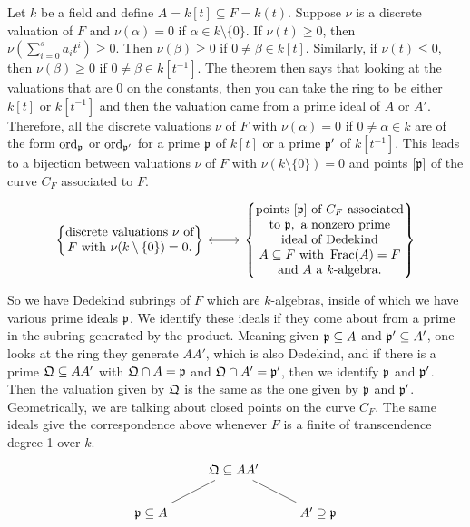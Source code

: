 \begin{ex}
Let $k$ be a field and define $A=k[t] \subseteq F=k(t)$. Suppose $\nu$ is a discrete valuation of $F$ and $\nu(\alpha)=0$ if $\alpha \in k \setminus \{0\}$. If $\nu(t) \geq 0$, then $\nu(\sum_{i=0}^s a_it^i) \geq 0$. Then $\nu(\beta) \geq 0$ if $0 \neq \beta \in k[t]$. Similarly, if $\nu(t) \leq 0$, then $\nu(\beta) \geq 0$ if $0 \neq \beta \in k[t^{-1}]$. The theorem then says that looking at the valuations that are 0 on the constants, then you can take the ring to be either $k[t]$ or $k[t^{-1}]$ and then the valuation came from a prime ideal of $A$ or $A'$. Therefore, all the discrete valuations $\nu$ of $F$ with $\nu(\alpha)=0$ if $0 \neq \alpha \in k$ are of the form $\operatorname{ord}_{\mathfrak{p}}$ or $\operatorname{ord}_{\mathfrak{p}'}$ for a prime $\mathfrak{p}$ of $k[t]$ or a prime $\mathfrak{p}'$ of $k[t^{-1}]$. This leads to a bijection between valuations $\nu$ of $F$ with $\nu(k \setminus \{0\})=0$ and points $[\mathfrak{p}]$ of the curve $C_F$ associated to $F$.
	\[
	\begin{tikzcd}
	\left\{ \begin{array}{@{}c@{}} \text{discrete valuations }\nu \text{ of} \\ F \text{ with } \nu(k\setminus\{0\})=0.\end{array} \right\} \arrow[leftrightarrow]{r} &  \left\{ \begin{array}{@{}c@{}} \text{points }[\p] \text{ of }C_F \text{ associated}\\ \text{to }\p, \text{ a nonzero prime} \\ \text{ideal of Dedekind} \\ A \subseteq F \text{ with } \Frac(A)=F \\ \text{and }A \text{ a }k\text{-algebra}.\end{array} \right\}
	\end{tikzcd}
	\]
So we have Dedekind subrings of $F$ which are $k$-algebras, inside of which we have various prime ideals $\mathfrak{p}$. We identify these ideals if they come about from a prime in the subring generated by the product. Meaning given $\mathfrak{p} \subseteq A$ and $\mathfrak{p}' \subseteq A'$, one looks at the ring they generate $AA'$, which is also Dedekind, and if there is a prime $\mathfrak{Q} \subseteq AA'$ with $\mathfrak{Q} \cap A=\mathfrak{p}$ and $\mathfrak{Q} \cap A'=\mathfrak{p}'$, then we identify $\mathfrak{p}$ and $\mathfrak{p}'$. Then the valuation given by $\mathfrak{Q}$ is the same as the one given by $\mathfrak{p}$ and $\mathfrak{p}'$. Geometrically, we are talking about closed points on the curve $C_F$. The same ideals give the correspondence above whenever $F$ is a finite of transcendence degree 1 over $k$.
	\[
	\begin{tikzcd}
	 & \fQ \subseteq AA' \arrow[dash]{dl} \arrow[dash]{dr} & \\
	\p \subseteq A & & A' \supseteq \p
	\end{tikzcd}
	\]
\end{ex}

